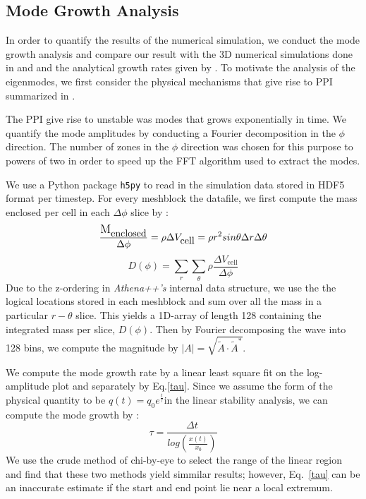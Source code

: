 \documentclass[iop,revtex4]{emulateapj}
\begin{document}
\subsection{Mode Growth Analysis}
\par In order to quantify the results of the numerical simulation, we conduct the mode growth analysis and compare our result with the 3D numerical simulations done in \cite{Hawley:1990A} and \cite{Hawley:1991A} and the analytical growth rates given by \cite{Goldreich:1986A}. To motivate the analysis of the eigenmodes, we first consider the physical mechanisms that give rise to \ac{PPI} summarized in \cite{Narayan:1989A}.
\par The \ac{PPI} give rise to unstable was modes that grows exponentially in time. We quantify the mode amplitudes by conducting a Fourier decomposition in the $\phi$ direction. The number of zones in the $\phi$ direction was chosen for this purpose to powers of two in order to speed up the \ac{FFT} algorithm used to extract the modes. 
\par We use a Python package \texttt{h5py} to read in the simulation data stored in HDF5 format per timestep. For every meshblock the datafile, we first compute the mass enclosed per cell in each $\Delta\phi$ slice by :
\begin{equation}
\frac{\mbox{\large M}_{\mbox{enclosed}}}{\Delta\phi} = \rho\Delta V_{\mbox{cell}} = \rho r^2 sin\theta \Delta r \Delta\theta
\end{equation}
\begin{equation}
D(\phi) = \sum_r \sum_\theta \rho \frac{\Delta V_{\mbox{cell}}}{\Delta\phi}
\end{equation}
Due to the z-ordering in \textit{Athena++'s} internal data structure, we use the the logical locations stored in each meshblock and sum over all the mass in a particular $r-\theta$ slice. This yields a 1D-array of length 128 containing the integrated mass per slice, $D(\phi)$. Then by Fourier decomposing the wave into 128 bins, we compute the magnitude by $|A|=\sqrt{\tilde{A}\cdot \tilde{A}^*}$. 
\par We compute the mode growth rate by a linear least square fit on the log-amplitude plot and separately by Eq.\ref{tau}. Since we assume the form of the physical quantity to be $q(t)=q_0 e^{\frac{t}{\tau}}$in the linear stability analysis, we can compute the mode growth by : 
\begin{equation}
\tau = \frac{\Delta t}{log(\frac{x(t)}{x_0})}
\label{tau}
\end{equation}
We use the crude method of chi-by-eye to select the range of the linear region and find that these two methods yield simmilar results; however, Eq.~\ref{tau} can be an inaccurate estimate if the start and end point lie near a local extremum. %
\end{document}
